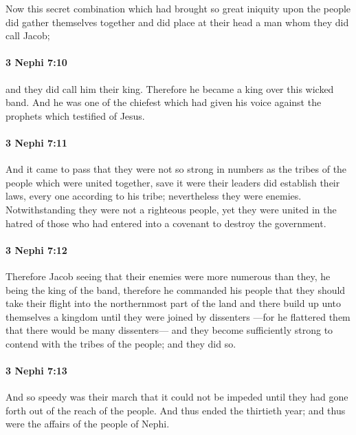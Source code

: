 			Now this secret combination
			which had brought so great iniquity upon the people
			did gather themselves together
			and did place at their head a man whom they did call Jacob;

		\paragraph{3 Nephi 7:10} %
			\label{3NEPHI-7-10}

			and they did call him their king.
			Therefore he became a king over this wicked band.
			And he was one of the chiefest
			which had given his voice against the prophets which testified of Jesus.

		\paragraph{3 Nephi 7:11} %
			\label{3NEPHI-7-11}

			And it came to pass that they were not so strong in numbers
			as the tribes of the people which were united together,
			save it were their leaders did establish their laws,
			every one according to his tribe;
			nevertheless they were enemies.
			Notwithstanding they were not a righteous people,
			yet they were united in the hatred of those
			who had entered into a covenant to destroy the government.

		\paragraph{3 Nephi 7:12} %
			\label{3NEPHI-7-12}

			Therefore Jacob seeing that their enemies were more numerous than they,
			he being the king of the band,
			therefore he commanded his people
			that they should take their flight into the northernmost part of the land
			and there build up unto themselves a kingdom
			until they were joined by dissenters
			---for he flattered them that there would be many dissenters---
			and they become sufficiently strong to contend with the tribes of the people;
			and they did so.

		\paragraph{3 Nephi 7:13} %
			\label{3NEPHI-7-13}

			And so speedy was their march that it could not be impeded
			until they had gone forth out of the reach of the people.
			And thus ended the thirtieth year;
			and thus were the affairs of the people of Nephi.

